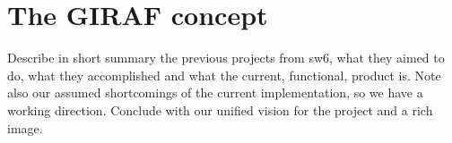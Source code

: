 \section{The GIRAF concept}
Describe in short summary the previous projects from sw6, what they aimed to do, what they accomplished and what the current, functional, product is.
Note also our assumed shortcomings of the current implementation, so we have a working direction.
Conclude with our unified vision for the project and a rich image.